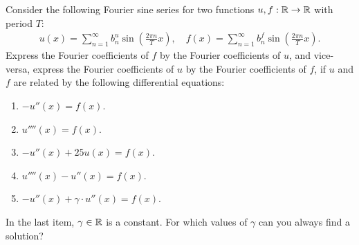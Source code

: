 \documentclass[11pt]{article}
\begin{document}
\begin{exercise}
    Consider the following Fourier sine series for two functions $u, f : \mathbb{R} \to \mathbb{R}$ with period $T$:
    \begin{align*}
        u(x) = \sum_{n=1}^{\infty} b_{n}^{u} \sin\left( \frac{2\pi n}{T} x \right)
        ,
        \quad 
        f(x) = \sum_{n=1}^{\infty} b_{n}^{f} \sin\left( \frac{2\pi n}{T} x \right)
        .
    \end{align*}
    Express the Fourier coefficients of $f$ by the Fourier coefficients of $u$, and vice-versa, express the Fourier coefficients of $u$ by the Fourier coefficients of $f$,
    if $u$ and $f$ are related by the following differential equations:
    \begin{enumerate}[label=(\alph*)]
     \item 
     $-u''(x) = f(x)$.
     \item 
     $u''''(x) = f(x)$.
     \item 
     $-u''(x) + 25 u(x) = f(x)$.
     \item 
     $u''''(x) - u''(x) = f(x)$.
     \item 
     $-u''(x) + \gamma \cdot u''(x) = f(x)$.
    \end{enumerate}
    In the last item, $\gamma \in \mathbb{R}$ is a constant. For which values of $\gamma$ can you always find a solution?
\end{exercise}
\end{document}
